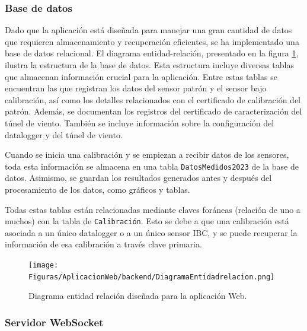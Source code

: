 \subsubsection{Base de datos}

Dado que la aplicación está diseñada para manejar una gran cantidad de datos que requieren almacenamiento y recuperación eficientes, se ha implementado una base de datos relacional. El diagrama entidad-relación, presentado en la figura \ref{fig:DiagramaEntidadRelacion}, ilustra la estructura de la base de datos. Esta estructura incluye diversas tablas que almacenan información crucial para la aplicación. Entre estas tablas se encuentran las que registran los datos del sensor patrón y el sensor bajo calibración, así como los detalles relacionados con el certificado de calibración del patrón. Además, se documentan los registros del certificado de caracterización del túnel de viento. También se incluye información sobre la configuración del datalogger y del túnel de viento.


Cuando se inicia una calibración y se empiezan a recibir datos de los sensores, toda esta información se almacena en una tabla \texttt{DatosMedidos2023} de la base de datos. Asimismo, se guardan los resultados generados antes y después del procesamiento de los datos, como gráficos y tablas.

Todas estas tablas están relacionadas mediante claves foráneas (relación de uno a muchos) con la tabla de \texttt{Calibración}. Esto se debe a que una calibración está asociada a un único datalogger o a un único sensor IBC, y se puede recuperar la información de esa calibración a través clave primaria.


\begin{figure}[H]
    \centering
    \texttt{[image: Figuras/AplicacionWeb/backend/DiagramaEntidadrelacion.png]}
    \caption{Diagrama entidad relación diseñada para la aplicación Web.}
    \label{fig:DiagramaEntidadRelacion}
\end{figure}

\subsubsection{Servidor WebSocket}

